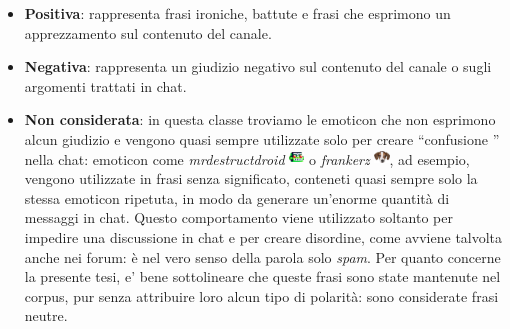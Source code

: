 \documentclass[a4paper,12pt,openright,twoside]{report}
\theoremstyle{definition}
\begin{document}
\begin{itemize}
\item \textbf{Positiva}: rappresenta frasi ironiche, battute e frasi che esprimono un apprezzamento sul contenuto del canale.
\item \textbf{Negativa}: rappresenta un giudizio negativo sul contenuto del canale o sugli argomenti trattati in chat.
\item \textbf{Non considerata}: in questa classe troviamo le emoticon che non esprimono alcun giudizio 
e vengono quasi sempre utilizzate solo per creare ``confusione '' nella chat:
emoticon come \emph{mrdestructdroid} \includegraphics[height=0.4cm, width=0.4cm]{Immagini/Emoticons/mrdestructoid.png} o \emph{frankerz} \includegraphics[height=0.4cm, width=0.4cm]{Immagini/Emoticons/frankerz.png},
ad esempio, vengono utilizzate in frasi senza significato, conteneti quasi
sempre solo la stessa emoticon ripetuta,
in modo da generare un'enorme quantità di messaggi in chat. 
Questo comportamento viene utilizzato soltanto per impedire 
una discussione in chat e per creare disordine, come avviene talvolta anche nei forum: 
è nel vero senso della parola solo \emph{spam}. 
Per quanto concerne la presente tesi, e' bene sottolineare che
queste frasi sono state mantenute nel corpus, pur senza attribuire loro alcun tipo di polarità: sono considerate frasi neutre.
\end{itemize}
\end{document}
